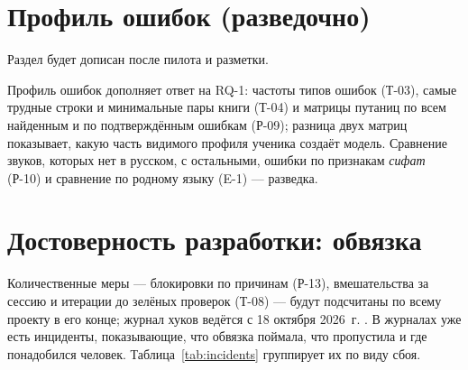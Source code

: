 \section{Профиль ошибок (разведочно)}\label{sec:eval-profile}

\begin{notebox}
Раздел будет дописан после пилота и разметки.
\end{notebox}

Профиль ошибок дополняет ответ на RQ-1: частоты типов ошибок (Т-03), самые трудные строки и минимальные пары
книги (Т-04) и матрицы путаниц по всем найденным и по подтверждённым ошибкам (Р-09); разница двух матриц
показывает, какую часть видимого профиля ученика создаёт модель. Сравнение звуков, которых нет в русском, с
остальными, ошибки по признакам \emph{сифат} (Р-10) и сравнение по родному языку (E-1) --- разведка.

\section{Достоверность разработки: обвязка}\label{sec:eval-harness}

Количественные меры --- блокировки по причинам (Р-13), вмешательства за сессию и итерации до зелёных
проверок (Т-08) --- будут подсчитаны по всему проекту в его конце; журнал хуков ведётся с 18 октября
2026~г. . В журналах уже есть инциденты, показывающие, что обвязка поймала, что
пропустила и где понадобился человек. Таблица~\ref{tab:incidents} группирует их по виду сбоя.

